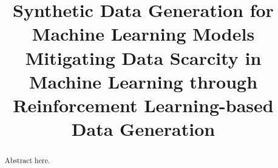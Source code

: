 \documentclass[sigconf, anonymous]{acmart}
\begin{document}
\title{Synthetic Data Generation for Machine Learning Models }

\title{Mitigating Data Scarcity in Machine Learning through Reinforcement Learning-based Data Generation}

\renewcommand{\shortauthors}{Trovato et al.}

\begin{abstract}
Abstract here.
\end{abstract}

\maketitle











\normalem


\end{document}

